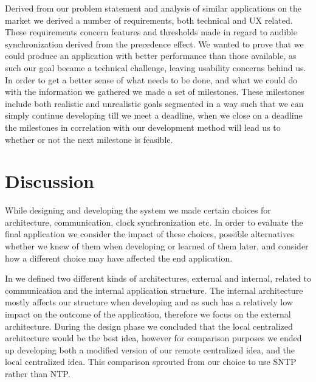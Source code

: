 Derived from our problem statement and analysis of similar applications on the market we derived a number of requirements, both technical and \ac{UX} related.
These requirements concern features and thresholds made in regard to audible synchronization derived from the precedence effect.
We wanted to prove that we could produce an application with better performance than those available, as such our goal became a technical challenge, leaving usability concerns behind us.
In order to get a better sense of what needs to be done, and what we could do with the information we gathered we made a set of milestones.
These milestones include both realistic and unrealistic goals segmented in a way such that we can simply continue developing till we meet a deadline, when we close on a deadline the milestones in correlation with our development method will lead us to whether or not the next milestone is feasible.



\section{Discussion}
While designing and developing the system we made certain choices for architecture, communication, clock synchronization etc.
In order to evaluate the final application we consider the impact of these choices, possible alternatives whether we knew of them when developing or learned of them later, and consider how a different choice may have affected the end application.

In  we defined two different kinds of architectures, external and internal, related to communication and the internal application structure.
The internal architecture mostly affects our structure when developing and as such has a relatively low impact on the outcome of the application, therefore we focus on the external architecture.
During the design phase we concluded that the local centralized architecture would be the best idea, however for comparison purposes we ended up developing both a modified version of our remote centralized idea, and the local centralized idea.
This comparison sprouted from our choice to use \ac{SNTP} rather than \ac{NTP}.

